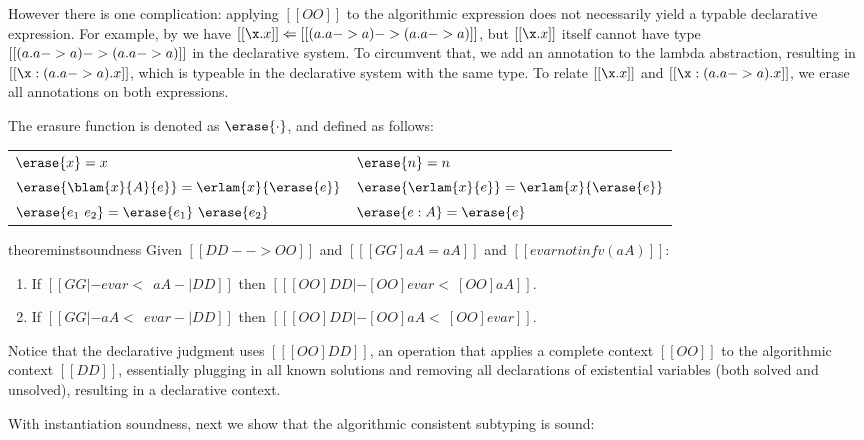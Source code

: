 However there is one complication: applying $[[OO]]$ to the algorithmic expression does not necessarily yield a typable declarative expression.
For example, by  we have $[[ \x .x   ]] \Leftarrow [[ (\/a. a -> a) -> (\/a. a -> a)   ]]   $,
but $[[ \x . x]]$ itself cannot have type
$[[ (\/a. a -> a) -> (\/a. a -> a)   ]]$ in the declarative system. To
circumvent that, we add an annotation to the lambda abstraction, resulting in
$[[ \x : (\/a . a -> a) . x   ]]$, which is typeable in the declarative system with
the same type. To relate $[[ \x . x   ]]$ and $[[ \x : (\/a. a -> a) . x   ]]$, we
erase all annotations on both expressions. 
\begin{definition} The erasure function is denoted as
  $\erase{\cdot}$, and defined as follows:
\begin{center}
\begin{tabular}{p{5cm}l}
    $\erase{x} = x $&
    $\erase{n} = n $\\
    $\erase{\blam{x}{A}{e}} = \erlam{x}{\erase{e}} $&
    $\erase{\erlam{x}{e}} = \erlam{x}{\erase{e}} $\\
    $\erase{e_1 ~ e_2} = \erase{e_1} ~ \erase{e_2} $&
    $\erase{e : A } = \erase{e}$
\end{tabular}
\end{center}
\end{definition}



\begin{restatable}{theorem}{instsoundness} \label{thm:inst_soundness}%
  Given $[[ DD --> OO ]]$ and $[[ [GG]aA = aA ]]$ and  $[[evar notin fv(aA)]]$:

  \begin{enumerate}
  \item If $[[GG |- evar <~~  aA -| DD ]]$ then $[[  [OO]DD |- [OO]evar <~ [OO]aA  ]] $.
  \item If $[[GG |- aA <~~ evar -| DD ]]$ then $[[  [OO]DD |- [OO]aA <~ [OO]evar  ]] $.
  \end{enumerate}
\end{restatable}

Notice that the declarative judgment uses $[[ [OO]DD   ]]$, an
operation that applies a complete context $[[OO]]$ to the algorithmic context
$[[DD]]$, essentially plugging in all known solutions and removing all
declarations of existential variables (both solved and unsolved), resulting in a
declarative context.

With instantiation soundness, next we show that the algorithmic consistent
subtyping is sound:

